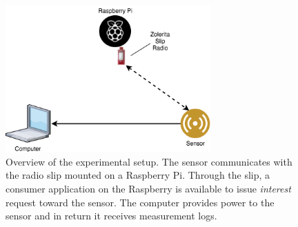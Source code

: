 \begin{figure}\centering
	\includegraphics[width=0.7\textwidth]{figures/experiment_setup.png}
	\caption{Overview of the experimental setup. The sensor communicates with the radio slip mounted on a Raspberry Pi. Through the slip, a consumer application on the Raspberry is available to issue \textit{interest} request toward the sensor. The computer provides power to the sensor and in return it receives measurement logs.}
	\label{fig:experiment_setup}
\end{figure}






